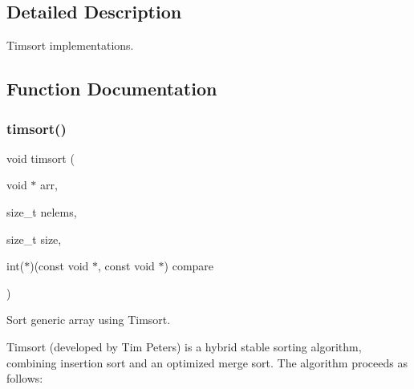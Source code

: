 \subsection{Detailed Description}
Timsort implementations. 



\subsection{Function Documentation}
\mbox{\label{group__Timsort_ga1c9fca70060e37617156b89b387aa4d3}} 
\subsubsection{\texorpdfstring{timsort()}{timsort()}}
{\footnotesize\ttfamily void timsort (\begin{DoxyParamCaption}\item[{void $\ast$}]{arr,  }\item[{size\+\_\+t}]{nelems,  }\item[{size\+\_\+t}]{size,  }\item[{int($\ast$)(const void $\ast$, const void $\ast$)}]{compare }\end{DoxyParamCaption})}



Sort generic array using Timsort. 

Timsort (developed by Tim Peters) is a hybrid stable sorting algorithm, combining insertion sort and an optimized merge sort. The algorithm proceeds as follows\+:


